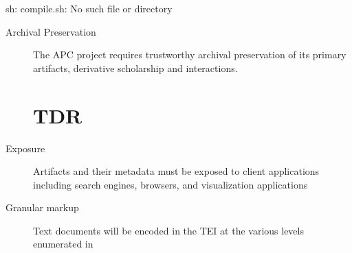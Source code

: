 sh: compile.sh: No such file or directory
\begin{description}
  \item[Archival Preservation] The APC project requires trustworthy archival preservation of its primary artifacts, derivative scholarship and interactions.
    \section{TDR}
    
  \item[Exposure] Artifacts and their metadata must be exposed to client applications including search engines, browsers, and visualization applications
  \item[Granular markup] Text documents will be encoded in the TEI at the various levels enumerated in \cite{tei_sig_on_libraries_best_2011} 
\end{description}
